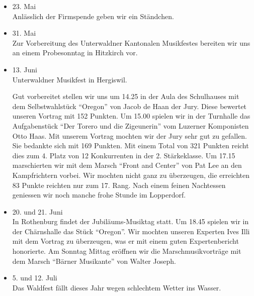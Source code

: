 \begin{history}
\begin{itemize}
        \item[]23. Mai\\
        Anlässlich der Firmspende geben wir ein Ständchen.

        \item[]31. Mai\\
        Zur Vorbereitung des Unterwaldner Kantonalen Musikfestes bereiten wir
        uns an einem Probesonntag in Hitzkirch vor.

        \item[]13. Juni\\
        Unterwaldner Musikfest in Hergiswil.

        Gut vorbereitet stellen wir uns um 14.25 in der Aula des Schulhauses mit
        dem Selbstwahlstück \enquote{Oregon} von Jacob de Haan der Jury. Diese
        bewertet unseren Vortrag mit 152 Punkten. Um 15.00 spielen wir in der
        Turnhalle das Aufgabenstück \enquote{Der Torero und die Zigeunerin} vom
        Luzerner Komponisten Otto Haas. Mit unserem Vortrag mochten wir der Jury
        sehr gut zu gefallen. Sie bedankte sich mit 169 Punkten. Mit einem Total
        von 321 Punkten reicht dies zum 4. Platz von 12 Konkurrenten in der 2.
        Stärkeklasse. Um 17.15 marschierten wir mit dem Marsch \enquote{Front
            and Center} von Pat Lee an den Kampfrichtern vorbei. Wir mochten nicht
        ganz zu überzeugen, die erreichten 83 Punkte reichten nur zum 17. Rang.
        Nach einem feinen Nachtessen geniessen wir  noch manche frohe Stunde im
        Lopperdorf.

        \item[]20. und 21. Juni\\
        In Rothenburg findet der Jubiläums-Musiktag statt. Um 18.45 spielen wir
        in der Chärnshalle das Stück \enquote{Oregon}. Wir mochten unseren
        Experten Ives Illi mit dem Vortrag zu überzeugen, was er mit einem guten
        Expertenbericht honorierte. Am Sonntag Mittag eröffnen wir die
        Marschmusikvorträge mit dem Marsch \enquote{Bärner Musikante} von Walter
        Joseph.

        \item[]5. und 12. Juli\\
        Das Waldfest fällt dieses Jahr wegen schlechtem Wetter ins Wasser.


\end{itemize}
\end{history}
